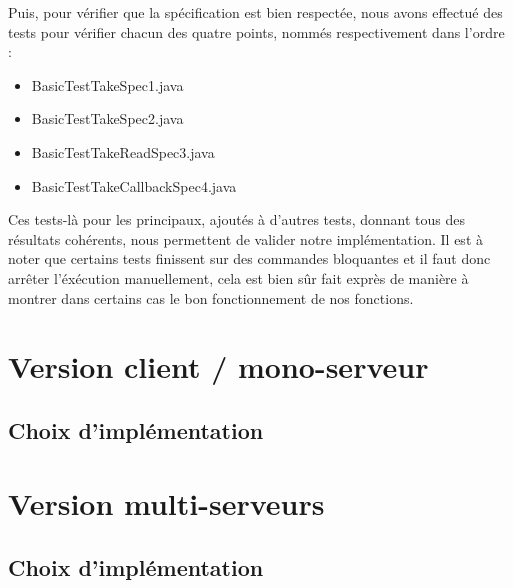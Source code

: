 \documentclass{report}
\begin{document}
Puis, pour vérifier que la spécification est bien respectée, nous avons effectué des tests pour vérifier chacun des quatre points, nommés respectivement dans l'ordre :
\begin{itemize}
\item BasicTestTakeSpec1.java
\item BasicTestTakeSpec2.java
\item BasicTestTakeReadSpec3.java
\item BasicTestTakeCallbackSpec4.java
\end{itemize}

Ces tests-là pour les principaux, ajoutés à d'autres tests, donnant tous des résultats cohérents, nous permettent de valider notre implémentation. Il est à noter que certains tests finissent
sur des commandes bloquantes et il faut donc arrêter l'éxécution manuellement, cela est bien sûr fait exprès de manière à montrer dans certains cas le bon fonctionnement de nos fonctions.

\chapter{Version client / mono-serveur}

\section{Choix d'implémentation}

\chapter{Version multi-serveurs}

\section{Choix d'implémentation}
\end{document}
